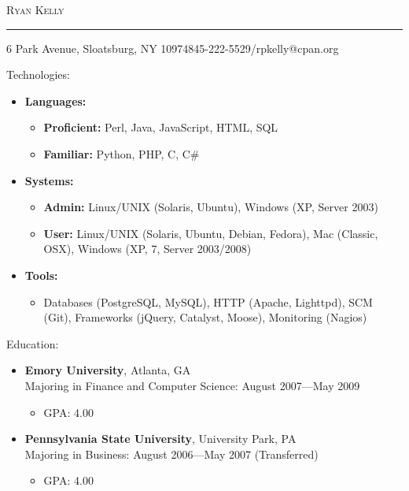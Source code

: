 \documentclass[10pt,oneside]{article}
\makeatletter
\newcommand{\name}{Ryan Kelly}
\newcommand{\addr}{6 Park Avenue, Sloatsburg, NY 10974}
\newcommand{\phone}{845-222-5529}
\newcommand{\email}{rpkelly@cpan.org}
\newcommand{\bigname}[1]{
	\begin{flushleft}\fontfamily{phv}\selectfont\Huge\scshape#1\end{flushleft}
}
\newenvironment{ressection}[1]{
	\vspace{1pt}
	{\fontfamily{phv}\selectfont\Large#1}
	\begin{itemize}
	\vspace{1pt}
}{
	\end{itemize}
}
\newcommand{\resitem}[1]{
	\vspace{-4pt}
	\item \begin{flushleft} #1 \end{flushleft}
}
\newcommand{\ressubitem}[1]{
	\vspace{-2pt}
	\item \begin{flushleft} #1 \end{flushleft}
}
\newcommand{\resbigitem}[3]{
	\vspace{-5pt}
	\item
	\textbf{#1}, #2 \\
	#3
}
\newenvironment{ressubsec}[3]{
	\resbigitem{#1}{#2}{#3}
	\vspace{-2pt}
	\begin{itemize}
}{
	\end{itemize}
}
\newenvironment{reslist}[1]{
	\resitem{\textbf{#1}}
	\vspace{-5pt}
	\begin{itemize}
}{
	\end{itemize}
}
\makeatother
\begin{document}
 \selectfont

\bigname{\name}

\vspace{-8pt} \rule{\textwidth}{1pt}

\vspace{-1pt} {\small \addr \hfill \phone/\email}

\vspace{8 pt}

\begin{ressection}{Technologies:}

    \begin{reslist}{Languages:}
        \ressubitem{\textbf{Proficient:} Perl, Java, JavaScript, HTML, SQL}
        \ressubitem{\textbf{Familiar:} Python, PHP, C, C\#}
    \end{reslist}

    \begin{reslist}{Systems:}
        \ressubitem{\textbf{Admin:} Linux/UNIX (Solaris, Ubuntu), Windows (XP, Server 2003)}
        \ressubitem{\textbf{User:} Linux/UNIX (Solaris, Ubuntu, Debian, Fedora), Mac (Classic, OSX), Windows (XP, 7, Server 2003/2008)}
    \end{reslist}

    \begin{reslist}{Tools:}
       \ressubitem{Databases (PostgreSQL, MySQL), HTTP (Apache, Lighttpd), SCM (Git), Frameworks (jQuery, Catalyst, Moose), Monitoring (Nagios)} 
    \end{reslist}

\end{ressection}

\begin{ressection}{Education:}

	\begin{ressubsec}{Emory University}{Atlanta, GA}{Majoring in Finance and Computer Science: August 2007---May 2009}
		\ressubitem{GPA: 4.00}
	\end{ressubsec}

	\begin{ressubsec}{Pennsylvania State University}{University Park, PA}{Majoring in Business: August 2006---May 2007 (Transferred)}
		\ressubitem{GPA: 4.00}
	\end{ressubsec}

\end{ressection}
\end{document}
